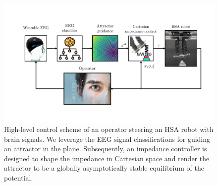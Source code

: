 \begin{figure}[hbt]
    \centering
    \includegraphics[width=0.7\columnwidth]{braincontrol/figures/control_scheme/control_scheme_high_level_overview_cropped.pdf}
    \caption{High-level control scheme of an operator steering an \gls{HSA} robot with brain signals. We leverage the \gls{EEG} signal classifications for guiding an attractor in the plane. Subsequently, an impedance controller is designed to shape the impedance in Cartesian space and render the attractor to be a globally asymptotically stable equilibrium of the potential.}
    \label{fig:braincontrol:control_scheme_high_level_overview}
\end{figure}

